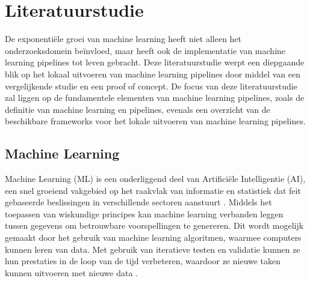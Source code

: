 
\section{Literatuurstudie}%
\label{sec:state-of-the-art}
De exponentiële groei van machine learning heeft niet alleen het onderzoeksdomein beïnvloed, maar heeft ook de implementatie van machine learning pipelines tot leven gebracht.
Deze literatuurstudie werpt een diepgaande blik op het lokaal uitvoeren van machine learning pipelines door middel van een vergelijkende studie en een proof of concept.
De focus van deze literatuurstudie zal liggen op de fundamentele elementen van machine learning pipelines, zoals de definitie van machine learning en pipelines, evenals een overzicht van de beschikbare frameworks voor het lokale uitvoeren van machine learning pipelines.
\subsection{Machine Learning}
Machine Learning (ML) is een onderliggend deel van Artificiële Intelligentie (AI), een snel groeiend vakgebied op het raakvlak van informatie en statistiek dat feit gebaseerde beslissingen in verschillende sectoren aanstuurt \autocite{Jordan2015}.
Middels het toepassen van wiskundige principes kan machine learning verbanden leggen tussen gegevens om betrouwbare voorspellingen te genereren. Dit wordt mogelijk gemaakt door het gebruik van machine learning algoritmen, waarmee computers kunnen leren van data. Met gebruik van iteratieve testen en validatie kunnen ze hun prestaties in de loop van de tijd verbeteren, waardoor ze nieuwe taken kunnen uitvoeren met nieuwe data \autocite{Shaveta2023}.
